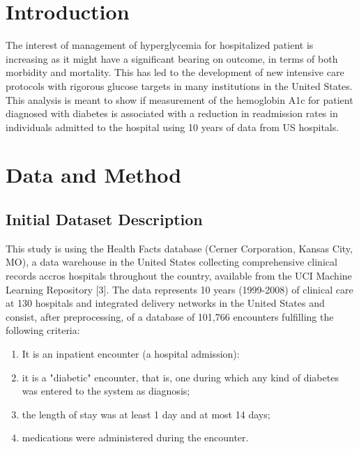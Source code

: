 \documentclass[12pt]{article}
\begin{document}
\section{Introduction}

The interest of management of hyperglycemia for hospitalized patient is increasing as it might have a significant bearing on outcome, in terms of both morbidity and mortality. This has led to the development of new intensive care protocols with rigorous glucose targets in many institutions in the United States. This analysis is meant to show if measurement of the hemoglobin A1c for patient diagnosed with diabetes is associated with a reduction in readmission rates in individuals admitted to the hospital using 10 years of data from US hospitals.



\section{Data and Method}

\subsection{Initial Dataset Description}

\label{init}

This study is using the Health Facts database (Cerner Corporation, Kansas City, MO), a data warehouse in the United States collecting comprehensive clinical records accros hospitals throughout the country, available from the UCI Machine Learning Repository [3].
The data represents 10 years (1999-2008) of clinical care at 130 hospitals and integrated delivery networks in the United States and consist, after preprocessing, of a database of 101,766 encounters  fulfilling the following criteria:

\begin{enumerate}
\item It is an inpatient encounter (a hospital admission):
\item it is a "diabetic" encounter, that is, one during which any kind of diabetes was entered to the system as diagnosis;
\item the length of stay was at least 1 day and at most 14 days;
\item medications were administered during the encounter.
\end{enumerate}
\end{document}
